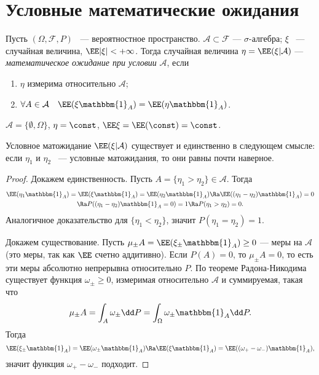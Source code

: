 \section{Условные математические ожидания}

 \begin{definition}
    Пусть $(\Omega, \mathcal{F}, P)$ ~--- вероятностное пространство. $\mathcal{A}\subset\mathcal{F}$ ---
     $\sigma$-алгебра; $\xi$ ~--- случайная величина, $\EE |\xi| < +\infty$.
     Тогда случайная величина $\eta = \EE (\xi | \mathcal{A})$ --- \textit{математическое ожидание при условии} $\mathcal{A}$, если
     \begin{enumerate}
         \item $\eta$ измерима относительно $\mathcal{A}$;
         \item $\forall A\in\mathcal{A} \quad \EE (\xi \mathbbm{1}_A) = \EE (\eta\mathbbm{1}_A)$.
     \end{enumerate}
 \end{definition}

 \begin{example}
     $\mathcal{A} = \{\emptyset, \Omega\}$, $\eta = \const$, $\EE \xi = \EE (\const) = \const$.
 \end{example}

 \begin{theorem}\label{th:uslsuch}
     Условное матожидание $\EE (\xi | \mathcal{A})$ существует и единственно в следующем смысле: если $\eta_1$ и $\eta_2$ ~--- условные матожидания, то они равны почти наверное.
 \end{theorem}

 \begin{proof}
     Докажем единственность. Пусть
     $A = \{\eta_1 > \eta_2\} \in\mathcal{A}$. Тогда
     \begin{multline*}
         \EE (\eta_1\mathbbm{1}_A) = \EE (\xi\mathbbm{1}_A) = \EE (\eta_2\mathbbm{1}_A) \Ra \EE ((\eta_1 - \eta_2)\mathbbm{1}_A) = 0 \\ \Ra P((\eta_1-\eta_2)\mathbbm{1}_A = 0) = 1 \Ra P(\eta_1 > \eta_2 ) = 0.
     \end{multline*}
   Аналогичное доказательство для $ \{\eta_1 < \eta_2\}$, значит $P(\eta_1 = \eta_2) = 1$.

    Докажем существование. Пусть
     $\mu_\pm A = \EE (\xi_\pm\mathbbm{1}_A)\ge 0$ --- меры на $\mathcal{A}$ (это меры, так как $\EE $ счетно аддитивно).
     Если $P(A) = 0$, то $\mu_\pm A = 0$, то есть эти меры абсолютно непрерывна относительно $P$.
     По теореме Радона-Никодима существует функция $\omega_\pm \ge 0$, измеримая относительно $\mathcal{A}$ и суммируемая, такая что 
     $$\mu_\pm A = \int_A \omega_\pm \dd P =
         \int_\Omega \omega_\pm \mathbbm{1}_A \dd P.$$
    Тогда
    $$\EE (\xi_\pm \mathbbm{1}_A) = \EE (\omega_\pm \mathbbm{1}_A) \Ra \EE (\xi \mathbbm{1}_A) = \EE ((\omega_{+} - \omega_{-})\mathbbm{1}_A),$$ 
    значит функция $ \omega_{+} - \omega_{-}$ подходит.
 \end{proof}

